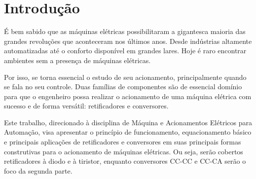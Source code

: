 \section{Introdução}

É bem sabido que as máquinas elétricas possibilitaram a gigantesca maioria das grandes revoluções que aconteceram nos últimos anos. Desde indústrias altamente automatizadas até o conforto disponível em grandes lares. Hoje é raro encontrar ambientes sem a presença de máquinas elétricas.

Por isso, se torna essencial o estudo de seu acionamento, principalmente quando se fala no seu controle. Duas famílias de componentes são de essencial domínio para que o engenheiro possa realizar o acionamento de uma máquina elétrica com sucesso e de forma versátil: retificadores e conversores.

Este trabalho, direcionado à disciplina de Máquina e Acionamentos Elétricos para Automação, visa apresentar o princípio de funcionamento, equacionamento básico e principais aplicações de retificadores e conversores em suas principais formas construtivas para o acionamento de máquinas elétricas. Ou seja, serão cobertos retificadores à diodo e à tiristor, enquanto conversores CC-CC e CC-CA serão o foco da segunda parte.


